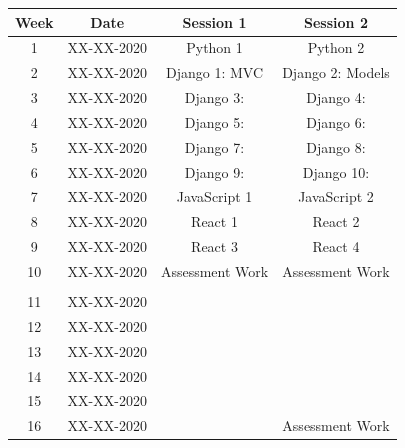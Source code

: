 \documentclass{article}
\begin{document}
\renewcommand{\arraystretch}{1.5}
\begin{tabular}{|c|c|c|c|}
  \hline
  \textbf{Week} & \textbf{Date} & \textbf{Session 1} & \textbf{Session 2} \\ \hline
  1             & XX-XX-2020    & Python 1           & Python 2           \\ \hline
  2             & XX-XX-2020    & Django 1: MVC         & Django 2: Models          \\ \hline
  3             & XX-XX-2020    & Django 3:          & Django 4:          \\ \hline
  4             & XX-XX-2020    & Django 5:          & Django 6:          \\ \hline
  5             & XX-XX-2020    & Django 7:          & Django 8:          \\ \hline
  6             & XX-XX-2020    & Django 9:          & Django 10:         \\ \hline
  7             & XX-XX-2020    & JavaScript 1       & JavaScript 2       \\ \hline
  8             & XX-XX-2020    & React 1            & React 2            \\ \hline
  9             & XX-XX-2020    & React 3            & React 4            \\ \hline
  10            & XX-XX-2020    & Assessment Work    & Assessment Work    \\ \hline
  \rowcolor{yellow} \multicolumn{4}{|c|}{Mid Term Break}                                                      \\ \hline
  11            & XX-XX-2020    &                    &                    \\ \hline
  12            & XX-XX-2020    &                    &                    \\ \hline
  13            & XX-XX-2020    &                    &                    \\ \hline
  14            & XX-XX-2020    &                    &                    \\ \hline
  15            & XX-XX-2020    &                    &                    \\ \hline
  16            & XX-XX-2020    &                    & Assessment Work    \\ \hline
\end{tabular}
\end{document}
